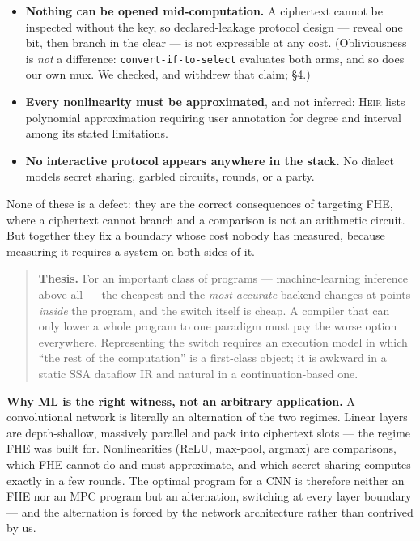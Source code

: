 \documentclass[10pt]{article}
\newcommand{\heir}{\textsc{Heir}}
\begin{document}
\begin{itemize}
\item \textbf{Nothing can be opened mid-computation.} A ciphertext cannot be
inspected without the key, so declared-leakage protocol design --- reveal one
bit, then branch in the clear --- is not expressible at any cost. (Obliviousness
is \emph{not} a difference: \texttt{convert-if-to-select} evaluates both arms,
and so does our own mux. We checked, and withdrew that claim; §4.)
\item \textbf{Every nonlinearity must be approximated}, and not inferred:
\heir{} lists polynomial approximation requiring user annotation for degree and
interval among its stated limitations.
\item \textbf{No interactive protocol appears anywhere in the stack.} No
dialect models secret sharing, garbled circuits, rounds, or a party.
\end{itemize}

None of these is a defect: they are the correct consequences of targeting FHE,
where a ciphertext cannot branch and a comparison is not an arithmetic circuit.
But together they fix a boundary whose cost nobody has measured, because
measuring it requires a system on both sides of it.

\begin{quote}
\textbf{Thesis.} For an important class of programs --- machine-learning
inference above all --- the cheapest and the \emph{most accurate} backend
changes at points \emph{inside} the program, and the switch itself is cheap. A
compiler that can only lower a whole program to one paradigm must pay the worse
option everywhere. Representing the switch requires an execution model in which
``the rest of the computation'' is a first-class object; it is awkward in a
static SSA dataflow IR and natural in a continuation-based one.
\end{quote}

\noindent\textbf{Why ML is the right witness, not an arbitrary application.} A
convolutional network is literally an alternation of the two regimes. Linear
layers are depth-shallow, massively parallel and pack into ciphertext slots ---
the regime FHE was built for. Nonlinearities (ReLU, max-pool, argmax) are
comparisons, which FHE cannot do and must approximate, and which secret sharing
computes exactly in a few rounds. The optimal program for a CNN is therefore
neither an FHE nor an MPC program but an alternation, switching at every layer
boundary --- and the alternation is forced by the network architecture rather
than contrived by us.
\end{document}
